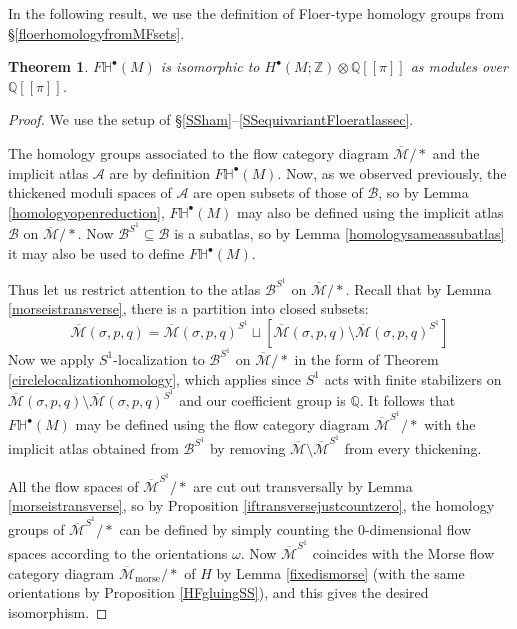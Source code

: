 \documentclass[12pt]{article}
\newtheorem{theorem}{Theorem}[subsection]
\theoremstyle{definition}
\theoremstyle{remark}
\numberwithin{equation}{subsection}
\newcommand{\ZZ}{\mathbb Z}
\newcommand{\QQ}{\mathbb Q}
\newcommand{\HH}{\mathbb H}
\newcommand{\A}{\mathcal A}
\newcommand{\B}{\mathcal B}
\newcommand{\Mbar}{\overline{\mathcal M}}
\newcommand{\morse}{\mathrm{morse}}
\begin{document}
In the following result, we use the definition of Floer-type homology groups from \S\ref{floerhomologyfromMFsets}.

\begin{theorem}\label{HFcalculation}
$F\HH^\bullet(M)$ is isomorphic to $H^\bullet(M;\ZZ)\otimes\QQ[[\pi]]$ as modules over $\QQ[[\pi]]$.
\end{theorem}

\begin{proof}
We use the setup of \S\ref{SSham}--\ref{SSequivariantFloeratlassec}.

The homology groups associated to the flow category diagram $\Mbar/\ast$ and the implicit atlas $\A$ are by definition $F\HH^\bullet(M)$.  Now, as we observed previously, the thickened moduli spaces of $\A$ are open subsets of those of $\B$, so by Lemma \ref{homologyopenreduction}, $F\HH^\bullet(M)$ may also be defined using the implicit atlas $\B$ on $\Mbar/\ast$.  Now $\B^{S^1}\subseteq\B$ is a subatlas, so by Lemma \ref{homologysameassubatlas} it may also be used to define $F\HH^\bullet(M)$.

Thus let us restrict attention to the atlas $\B^{S^1}$ on $\Mbar/\ast$.  Recall that by Lemma \ref{morseistransverse}, there is a partition into closed subsets:
\begin{equation}
\Mbar(\sigma,p,q)=\Mbar(\sigma,p,q)^{S^1}\sqcup[\Mbar(\sigma,p,q)\setminus\Mbar(\sigma,p,q)^{S^1}]
\end{equation}
Now we apply $S^1$-localization to $\B^{S^1}$ on $\Mbar/\ast$ in the form of Theorem \ref{circlelocalizationhomology}, which applies since $S^1$ acts with finite stabilizers on $\Mbar(\sigma,p,q)\setminus\Mbar(\sigma,p,q)^{S^1}$ and our coefficient group is $\QQ$.  It follows that $F\HH^\bullet(M)$ may be defined using the flow category diagram $\Mbar^{S^1}/\ast$ with the implicit atlas obtained from $\B^{S^1}$ by removing $\Mbar\setminus\Mbar^{S^1}$ from every thickening.

All the flow spaces of $\Mbar^{S^1}/\ast$ are cut out transversally by Lemma \ref{morseistransverse}, so by Proposition \ref{iftransversejustcountzero}, the homology groups of $\Mbar^{S^1}/\ast$ can be defined by simply counting the $0$-dimensional flow spaces according to the orientations $\omega$.  Now $\Mbar^{S^1}$ coincides with the Morse flow category diagram $\Mbar_\morse/\ast$ of $H$ by Lemma \ref{fixedismorse} (with the same orientations by Proposition \ref{HFgluingSS}), and this gives the desired isomorphism.
\end{proof}
\end{document}
